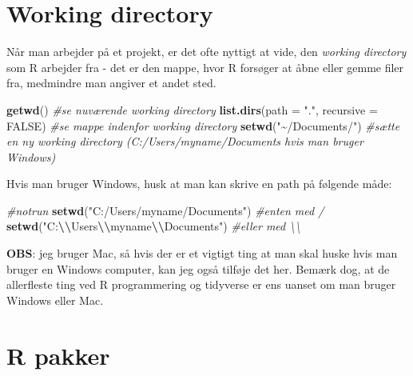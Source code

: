 \documentclass[
]{book}
\newenvironment{Shaded}{\begin{snugshade}}{\end{snugshade}}
\newcommand{\AttributeTok}[1]{\textcolor[rgb]{0.13,0.29,0.53}{#1}}
\newcommand{\CommentTok}[1]{\textcolor[rgb]{0.56,0.35,0.01}{\textit{#1}}}
\newcommand{\ConstantTok}[1]{\textcolor[rgb]{0.56,0.35,0.01}{#1}}
\newcommand{\FunctionTok}[1]{\textcolor[rgb]{0.13,0.29,0.53}{\textbf{#1}}}
\newcommand{\NormalTok}[1]{#1}
\newcommand{\SpecialCharTok}[1]{\textcolor[rgb]{0.81,0.36,0.00}{\textbf{#1}}}
\newcommand{\StringTok}[1]{\textcolor[rgb]{0.31,0.60,0.02}{#1}}
\begin{document}
\section{Working directory}\label{working-directory}

Når man arbejder på et projekt, er det ofte nyttigt at vide, den \emph{working directory} som R arbejder fra - det er den mappe, hvor R forsøger at åbne eller gemme filer fra, medmindre man angiver et andet sted.

\begin{Shaded}
\begin{Highlighting}[]
\FunctionTok{getwd}\NormalTok{() }\CommentTok{\#se nuværende working directory}
\FunctionTok{list.dirs}\NormalTok{(}\AttributeTok{path =} \StringTok{"."}\NormalTok{, }\AttributeTok{recursive =} \ConstantTok{FALSE}\NormalTok{) }\CommentTok{\#se mappe indenfor working directory}
\FunctionTok{setwd}\NormalTok{(}\StringTok{"\textasciitilde{}/Documents/"}\NormalTok{) }\CommentTok{\#sætte en ny working directory (C:/Users/myname/Documents hvis man bruger Windows)}
\end{Highlighting}
\end{Shaded}

Hvis man bruger Windows, husk at man kan skrive en path på følgende måde:

\begin{Shaded}
\begin{Highlighting}[]
\CommentTok{\#notrun}
\FunctionTok{setwd}\NormalTok{(}\StringTok{"C:/Users/myname/Documents"}\NormalTok{) }\CommentTok{\#enten med /}
\FunctionTok{setwd}\NormalTok{(}\StringTok{"C:}\SpecialCharTok{\textbackslash{}\textbackslash{}}\StringTok{Users}\SpecialCharTok{\textbackslash{}\textbackslash{}}\StringTok{myname}\SpecialCharTok{\textbackslash{}\textbackslash{}}\StringTok{Documents"}\NormalTok{) }\CommentTok{\#eller med \textbackslash{}\textbackslash{}}
\end{Highlighting}
\end{Shaded}

\textbf{OBS}: jeg bruger Mac, så hvis der er et vigtigt ting at man skal huske hvis man bruger en Windows computer, kan jeg også tilføje det her. Bemærk dog, at de allerfleste ting ved R programmering og tidyverse er ens uanset om man bruger Windows eller Mac.

\section{R pakker}\label{r-pakker}
\end{document}
